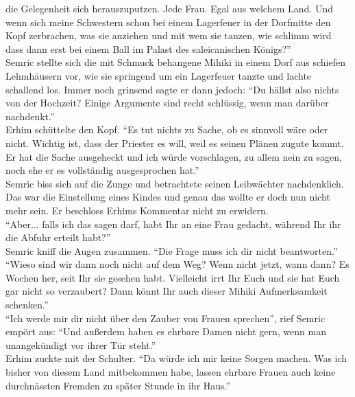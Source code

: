 die Gelegenheit sich herauszuputzen. Jede Frau. Egal aus welchem Land. Und wenn sich meine 
Schwestern schon bei einem Lagerfeuer in der Dorfmitte den Kopf zerbrachen, was sie anziehen und 
mit wem sie tanzen, wie schlimm wird dass dann erst bei einem Ball im Palast des saleicanischen 
Königs?''\\
Semric stellte sich die mit Schmuck behangene Mihiki in einem Dorf aus schiefen Lehmhäusern vor, 
wie sie springend um ein Lagerfeuer tanzte und lachte schallend los. Immer noch grinsend sagte er 
dann jedoch: ``Du hällst also nichts von der Hochzeit? Einige Argumente sind recht schlüssig, wenn 
man darüber nachdenkt.''\\
Erhim schüttelte den Kopf. ``Es tut nichts zu Sache, ob es sinnvoll wäre oder nicht. Wichtig ist, 
dass der Priester es will, weil es seinen Plänen zugute kommt. Er hat die Sache ausgeheckt und ich 
würde vorschlagen, zu allem nein zu sagen, noch ehe er es vollständig ausgesprochen hat.''\\
Semric biss sich auf die Zunge und betrachtete seinen Leibwächter nachdenklich. Das war die 
Einstellung eines Kindes und genau das wollte er doch nun nicht mehr sein. Er beschloss Erhims 
Kommentar nicht zu erwidern.\\
``Aber... falls ich das sagen darf, habt Ihr an eine Frau gedacht, während Ihr ihr die Abfuhr 
erteilt habt?''\\
Semric kniff die Augen zusammen. ``Die Frage muss ich dir nicht beantworten.''\\
``Wieso sind wir dann noch nicht auf dem Weg? Wenn nicht jetzt, wann dann? Es Wochen her, seit 
Ihr sie gesehen habt. Vielleicht irrt Ihr Euch und sie hat Euch gar nicht so verzaubert? Dann könnt 
Ihr auch dieser Mihiki Aufmerksamkeit schenken.''\\
``Ich werde mir dir nicht über den Zauber von Frauen sprechen'', rief Semric empört aus: ``Und 
außerdem haben es ehrbare Damen nicht gern, wenn man unangekündigt vor ihrer Tür steht.''\\
Erhim zuckte mit der Schulter. ``Da würde ich mir keine Sorgen machen. Was ich bisher  von diesem 
Land mitbekommen habe, lassen ehrbare Frauen auch keine durchnässten Fremden zu später Stunde in 
ihr Haus.''\\

